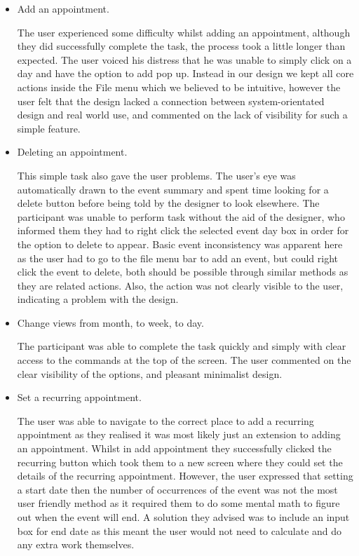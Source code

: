 \documentclass{article}
\begin{document}
\begin{itemize}
\item Add an appointment.

The user experienced some difficulty whilst adding an appointment,
although they did successfully complete the task, the process took a
little longer than expected. The user voiced his distress that he was
unable to simply click on a day and have the option to add pop up.
Instead in our design we kept all core actions inside the File menu
which we believed to be intuitive, however the user felt that
the design lacked a connection between system-orientated design and
real world use, and commented on the lack of visibility for such a
simple feature.

\item Deleting an appointment.

This simple task also gave the user problems. The user's eye was
automatically drawn to the event summary and spent time looking for a
delete button before being told by the designer to look elsewhere.
The participant was unable to perform task without the aid of the
designer, who informed them they had to right click the selected event
day box in order for the option to delete to appear. Basic event
inconsistency was apparent here as the user had to go to the file menu
bar to add an event, but could right click the event to delete, both
should be possible through similar methods as they are related actions.
Also, the action was not clearly visible to the user, indicating a
problem with the design.

\item Change views from month, to week, to day.

The participant was able to complete the task quickly and simply with
clear access to the commands at the top of the screen. The user
commented on the clear visibility of the options, and pleasant
minimalist design.

\item Set a recurring appointment.

The user was able to navigate to the correct place to add a recurring
appointment as they realised it was most likely just an extension to
adding an appointment. Whilst in add appointment they successfully
clicked the recurring button which took them to a new screen where they
could set the details of the recurring appointment. However, the user
expressed that setting a start date then the number of occurrences of
the event was not the most user friendly method as it required them to
do some mental math to figure out when the event will end. A solution
they advised was to include an input box for end date as this meant 
the user would not need to calculate and do any extra work themselves.


\end{itemize}
\end{document}
